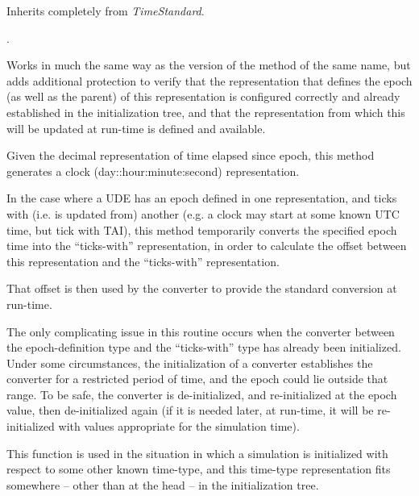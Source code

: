 {\begin{enumerate}
Inherits completely from \textit{TimeStandard}.

\label{ref:TimeUDE}
 .


{\begin{enumerate}
Works in much the same way as the 
version of the
method of the same name, but adds additional protection to verify that
the representation that defines the epoch (as well as the parent) of
this representation is configured correctly and already established in
the initialization tree, and that the representation from which this
will be updated at run-time is defined and available.

Given the decimal representation of time elapsed since epoch, this
method generates a clock (day::hour:minute:second) representation.




\label{ref:convertepochtoupdate}In the case where a UDE has an epoch
defined in one representation, and ticks with (i.e. is updated from)
another (e.g. a clock may start at some known UTC time, but tick with
TAI), this method temporarily converts the specified epoch time into
the {\textquotedblleft}ticks-with{\textquotedblright} representation,
in order to calculate the offset between this representation and the
{\textquotedblleft}ticks-with{\textquotedblright} representation.




That offset is then used by the converter to provide the standard
conversion at run-time.




The only complicating issue in this routine occurs when the converter
between the epoch-definition type and the
{\textquotedblleft}ticks-with{\textquotedblright} type has already been
initialized.  Under some circumstances, the initialization of a
converter establishes the converter for a restricted period of time,
and the epoch could lie outside that range.  To be safe, the converter
is de-initialized, and re-initialized at the epoch value, then
de-initialized again (if it is needed later, at run-time, it will be
re-initialized with values appropriate for the simulation time).




This function is used in the situation in which a simulation is
initialized with respect to some other known time-type, and this time-type
representation fits somewhere -- other than at the head -- in the
initialization tree.





\end{enumerate}}
\end{enumerate}}
